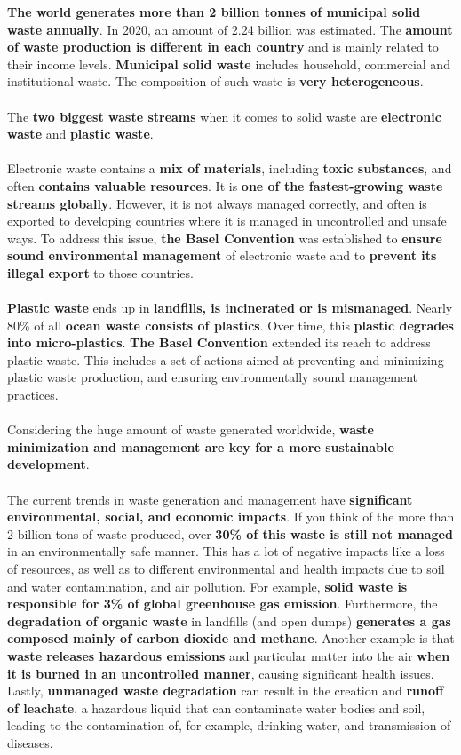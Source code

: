 \documentclass[../summary.tex]{subfiles}
\begin{document}
	\textbf{The world generates more than 2 billion tonnes of municipal solid waste annually}. In 2020, an amount of 2.24 billion was estimated. The \textbf{amount of waste production is different in each country} and is mainly related to their income levels. \textbf{Municipal solid waste} includes household, commercial and institutional waste. The composition of such waste is \textbf{very heterogeneous}. 
	\\\\
	The \textbf{two biggest waste streams} when it comes to solid waste are \textbf{electronic waste} and \textbf{plastic waste}.
	\\\\
	Electronic waste contains a \textbf{mix of materials}, including \textbf{toxic substances}, and often \textbf{contains valuable resources}. It is \textbf{one of the fastest-growing waste streams globally}. However, it is not always managed correctly, and often is exported to developing countries where it is managed in uncontrolled and unsafe ways. To address this issue, \textbf{the Basel Convention} was established to \textbf{ensure sound environmental management} of electronic waste and to \textbf{prevent its illegal export} to those countries.
	\\\\
	\textbf{Plastic waste} ends up in \textbf{landfills, is incinerated or is mismanaged}. Nearly 80\% of all \textbf{ocean waste consists of plastics}. Over time, this \textbf{plastic degrades into micro-plastics}. \textbf{The Basel Convention} extended its reach to address plastic waste. This includes a set of actions aimed at preventing and minimizing plastic waste production, and ensuring environmentally sound management practices.
	\\\\
	Considering the huge amount of waste generated worldwide, \textbf{waste minimization and management are key for a more sustainable development}.
	\\\\
	The current trends in waste generation and management have \textbf{significant environmental, social, and economic impacts}. If you think of the more than 2 billion tons of waste produced, over \textbf{30\% of this waste is still not managed} in an environmentally safe manner. This has a lot of negative impacts like a loss of resources, as well as to different environmental and health impacts due to soil and water contamination, and air pollution. For example, \textbf{solid waste is responsible for 3\% of global greenhouse gas emission}. Furthermore, the \textbf{degradation of organic waste} in landfills (and open dumps) \textbf{generates a gas composed mainly of carbon dioxide and methane}. Another example is that \textbf{waste releases hazardous emissions} and particular matter into the air \textbf{when it is burned in an uncontrolled manner}, causing significant health issues. Lastly, \textbf{unmanaged waste degradation} can result in the creation and \textbf{runoff of leachate}, a hazardous liquid that can contaminate water bodies and soil, leading to the contamination of, for example, drinking water, and transmission of diseases.
	\newpage
	
\end{document}
